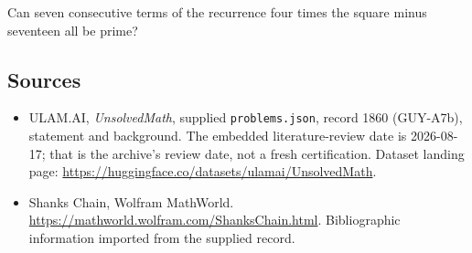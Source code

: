 \documentclass[11pt,a4paper]{article}
\begin{document}
Can seven consecutive terms of the recurrence four times the square minus seventeen all be prime?

\subsection{Sources}

{\small

\begin{itemize}

\item[\hypertarget{source:1860:1}{S1}] ULAM.AI, \emph{UnsolvedMath}, supplied \texttt{problems.json}, record 1860 (GUY-A7b), statement and background. The embedded literature-review date is 2026-08-17; that is the archive’s review date, not a fresh certification. Dataset landing page: \url{https://huggingface.co/datasets/ulamai/UnsolvedMath}.

\item[\hypertarget{source:1860:2}{S2}] Shanks Chain, Wolfram MathWorld. \url{https://mathworld.wolfram.com/ShanksChain.html}. Bibliographic information imported from the supplied record.

\end{itemize}

}

\label{end:1860}
\end{document}
